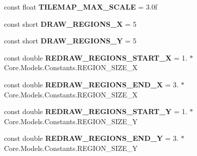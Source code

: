 \begin{DoxyCompactItemize}
\item 
\hypertarget{classClient_1_1Common_1_1Helper_1_1ClientConstants_a51a00204c51ce8da99a7dae7a0c9c24b}{const float {\bfseries T\-I\-L\-E\-M\-A\-P\-\_\-\-M\-A\-X\-\_\-\-S\-C\-A\-L\-E} = 3.\-0f}\label{classClient_1_1Common_1_1Helper_1_1ClientConstants_a51a00204c51ce8da99a7dae7a0c9c24b}

\item 
\hypertarget{classClient_1_1Common_1_1Helper_1_1ClientConstants_a05829491ea18162cd8b7a71640d949d4}{const short {\bfseries D\-R\-A\-W\-\_\-\-R\-E\-G\-I\-O\-N\-S\-\_\-\-X} = 5}\label{classClient_1_1Common_1_1Helper_1_1ClientConstants_a05829491ea18162cd8b7a71640d949d4}

\item 
\hypertarget{classClient_1_1Common_1_1Helper_1_1ClientConstants_a87f7ef3a586370c92e7165a19dc17c9e}{const short {\bfseries D\-R\-A\-W\-\_\-\-R\-E\-G\-I\-O\-N\-S\-\_\-\-Y} = 5}\label{classClient_1_1Common_1_1Helper_1_1ClientConstants_a87f7ef3a586370c92e7165a19dc17c9e}

\item 
\hypertarget{classClient_1_1Common_1_1Helper_1_1ClientConstants_ab15618493a1b3c441b454ad75afad02e}{const double {\bfseries R\-E\-D\-R\-A\-W\-\_\-\-R\-E\-G\-I\-O\-N\-S\-\_\-\-S\-T\-A\-R\-T\-\_\-\-X} = 1. $\ast$ Core.\-Models.\-Constants.\-R\-E\-G\-I\-O\-N\-\_\-\-S\-I\-Z\-E\-\_\-\-X}\label{classClient_1_1Common_1_1Helper_1_1ClientConstants_ab15618493a1b3c441b454ad75afad02e}

\item 
\hypertarget{classClient_1_1Common_1_1Helper_1_1ClientConstants_a989f3decc8372888fd282eab3be1d768}{const double {\bfseries R\-E\-D\-R\-A\-W\-\_\-\-R\-E\-G\-I\-O\-N\-S\-\_\-\-E\-N\-D\-\_\-\-X} = 3. $\ast$ Core.\-Models.\-Constants.\-R\-E\-G\-I\-O\-N\-\_\-\-S\-I\-Z\-E\-\_\-\-X}\label{classClient_1_1Common_1_1Helper_1_1ClientConstants_a989f3decc8372888fd282eab3be1d768}

\item 
\hypertarget{classClient_1_1Common_1_1Helper_1_1ClientConstants_afd8772b1bfbfea0b0ed22e5b224c7744}{const double {\bfseries R\-E\-D\-R\-A\-W\-\_\-\-R\-E\-G\-I\-O\-N\-S\-\_\-\-S\-T\-A\-R\-T\-\_\-\-Y} = 1. $\ast$ Core.\-Models.\-Constants.\-R\-E\-G\-I\-O\-N\-\_\-\-S\-I\-Z\-E\-\_\-\-Y}\label{classClient_1_1Common_1_1Helper_1_1ClientConstants_afd8772b1bfbfea0b0ed22e5b224c7744}

\item 
\hypertarget{classClient_1_1Common_1_1Helper_1_1ClientConstants_ab33ebb3b8725c3ab0b34e7b330b484ec}{const double {\bfseries R\-E\-D\-R\-A\-W\-\_\-\-R\-E\-G\-I\-O\-N\-S\-\_\-\-E\-N\-D\-\_\-\-Y} = 3. $\ast$ Core.\-Models.\-Constants.\-R\-E\-G\-I\-O\-N\-\_\-\-S\-I\-Z\-E\-\_\-\-Y}\label{classClient_1_1Common_1_1Helper_1_1ClientConstants_ab33ebb3b8725c3ab0b34e7b330b484ec}


\end{DoxyCompactItemize}
